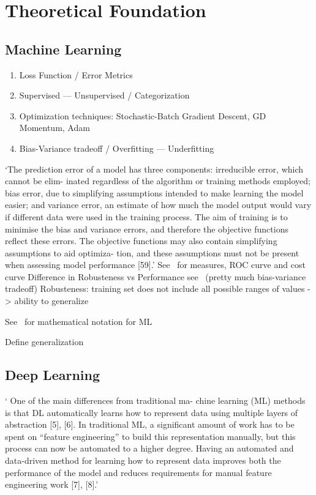 \chapter{Theoretical Foundation}\label{ch:theoretical}

\section{Machine Learning}

\begin{enumerate}
    \item Loss Function / Error Metrics
    \item Supervised --- Unsupervised / Categorization
    \item Optimization techniques: Stochastic-Batch Gradient Descent, GD Momentum, Adam
    \item Bias-Variance tradeoff / Overfitting --- Underfitting
\end{enumerate}

`The prediction error of a model has three components: irreducible error, which cannot be elim-
inated regardless of the algorithm or training methods employed; bias error, due to simplifying
assumptions intended to make learning the model easier; and variance error, an estimate of how
much the model output would vary if different data were used in the training process. The aim
of training is to minimise the bias and variance errors, and therefore the objective functions
reflect these errors. The objective functions may also contain simplifying assumptions to aid
optimiza- tion, and these assumptions must not be present when assessing model
performance [59].'\citep{ashmore_assuring_2021}
See~\citep{ashmore_assuring_2021} for measures, ROC curve and cost curve
Difference in Robusteness vs Performance see~\citep{ashmore_assuring_2021} (pretty much
bias-variance tradeoff)
Robusteness: training set does not include all possible ranges of values -> ability to generalize

See~\citep{seshia_formal_2018} for mathematical notation for ML

Define generalization

\section{Deep Learning}
` One of the main differences from traditional ma- chine learning (ML) methods is that DL
automatically learns how to represent data using multiple layers of abstraction [5], [6].
In traditional ML, a significant amount of work has to be spent on “feature engineering” to
build this representation manually, but this process can now be automated to a higher degree.
Having an automated and data-driven method for learning how to represent data improves both the
performance of the model and reduces requirements for manual feature engineering work
[7], [8].'~\citep{arpteg_software_2018}

